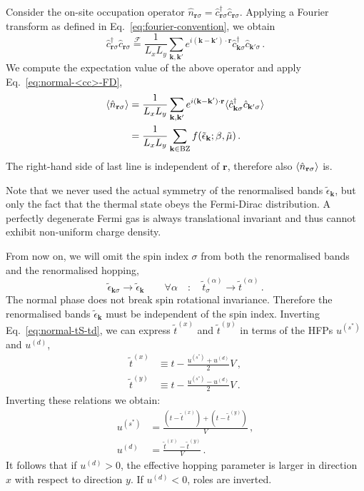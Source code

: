 \begin{tabproof}

	Consider the on-site occupation operator $\hat n_{\mathbf{r}\sigma} = \hat c_{\mathbf{r}\sigma}^\dagger \hat c_{\mathbf{r}\sigma}$. Applying a Fourier transform as defined in Eq.~\eqref{eq:fourier-convention}, we obtain
	\[
		\hat c_{\mathbf{r}\sigma}^\dagger \hat c_{\mathbf{r}\sigma} \stackrel{\mathcal{F}}{=} \frac{1}{L_x L_y} \sum_{\mathbf{k}, \mathbf{k}'} e^{i (\mathbf{k}-\mathbf{k}') \cdot\mathbf{r}} \hat c_{\mathbf{k}\sigma}^\dagger \hat c_{\mathbf{k}'\sigma} \, .
	\]
	We compute the expectation value of the above operator and apply Eq.~\eqref{eq:normal-<cc>-FD},
	\begin{align}
		\ev{\hat n_{\mathbf{r}\sigma}} &= \frac{1}{L_x L_y} \sum_{\mathbf{k}, \mathbf{k}'} e^{i (\mathbf{k}-\mathbf{k}') \cdot\mathbf{r}} \langle
			\hat c_{\mathbf{k}\sigma}^\dagger \hat c_{\mathbf{k}'\sigma}
		\rangle \nonumber \\
		&= \frac{1}{L_x L_y} \sum_{\mathbf{k}\in\mathrm{BZ}} f(\tilde{\epsilon}_\mathbf{k};\beta,\tilde{\mu}) \, . \label{eq:normal-<nr>}
	\end{align}
	The right-hand side of last line is independent of $\mathbf{r}$, therefore also $\ev{\hat n_{\mathbf{r}\sigma}}$ is.
	
	Note that we never used the actual symmetry of the renormalised bands $\tilde{\epsilon}_\mathbf{k}$, but only the fact that the thermal state obeys the Fermi-Dirac distribution. A perfectly degenerate Fermi gas is always translational invariant and thus cannot exhibit non-uniform charge density.
\end{tabproof}

From now on, we will omit the spin index $\sigma$ from both the renormalised bands and the renormalised hopping,
\[
	\tilde{\epsilon}_{\mathbf{k}\sigma} \to \tilde{\epsilon}_\mathbf{k}
	\qquad
	\forall \alpha
	\quad\colon\quad
	\tilde{t}_\sigma^{(\alpha)} \to \tilde{t}^{(\alpha)} \, .
\]
The normal phase does not break spin rotational invariance. Therefore the renormalised bands $\tilde{\epsilon}_\mathbf{k}$ must be independent of the spin index. Inverting Eq.~\eqref{eq:normal-tS-td}, we can
express $\tilde{t}^{(x)}$ and $\tilde{t}^{(y)}$ in terms of the HFPs $u^{(s^*)}$ and $u^{(d)}$,
\[
\begin{aligned}
	\tilde{t}^{(x)} &\equiv t - \frac{u^{(s^*)} + u^{(d)}}{2} V \, , \\
	\tilde{t}^{(y)} &\equiv t - \frac{u^{(s^*)} - u^{(d)}}{2} V \, .
\end{aligned}
\]
Inverting these relations we obtain:
\begin{align}
	u^{(s^*)} &= \frac{
		\left(
		t-\tilde{t}^{(x)}
		\right) + \left(
		t-\tilde{t}^{(y)}
		\right)
	}{V} \, , \label{eq:normal-us*(tx,ty)}
	\\
	u^{(d)} &= \frac{\tilde{t}^{(x)} - \tilde{t}^{(y)}}{V} \, . \label{eq:normal-ud(tx,ty)}
\end{align}
It follows that if $u^{(d)}>0$, the effective hopping parameter is larger in direction $x$ with respect to direction $y$. If $u^{(d)}<0$, roles are inverted.

